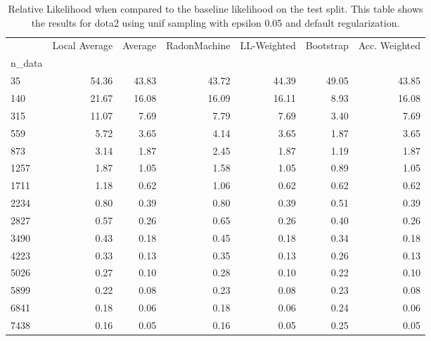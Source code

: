 \begin{table}
\centering
\caption{Relative Likelihood when compared to the baseline likelihood on the test split. This table shows the results for  dota2 using  unif sampling with epsilon  0.05 and  default regularization.}
\label{tab:5}
\begin{tabular}{lrrrrrr}
\toprule
{} &  Local Average &  Average &  RadonMachine &  LL-Weighted &  Bootstrap &  Acc. Weighted \\
n\_data &                &          &               &              &            &                \\
\midrule
35     &          54.36 &    43.83 &         43.72 &        44.39 &      49.05 &          43.85 \\
140    &          21.67 &    16.08 &         16.09 &        16.11 &       8.93 &          16.08 \\
315    &          11.07 &     7.69 &          7.79 &         7.69 &       3.40 &           7.69 \\
559    &           5.72 &     3.65 &          4.14 &         3.65 &       1.87 &           3.65 \\
873    &           3.14 &     1.87 &          2.45 &         1.87 &       1.19 &           1.87 \\
1257   &           1.87 &     1.05 &          1.58 &         1.05 &       0.89 &           1.05 \\
1711   &           1.18 &     0.62 &          1.06 &         0.62 &       0.62 &           0.62 \\
2234   &           0.80 &     0.39 &          0.80 &         0.39 &       0.51 &           0.39 \\
2827   &           0.57 &     0.26 &          0.65 &         0.26 &       0.40 &           0.26 \\
3490   &           0.43 &     0.18 &          0.45 &         0.18 &       0.34 &           0.18 \\
4223   &           0.33 &     0.13 &          0.35 &         0.13 &       0.26 &           0.13 \\
5026   &           0.27 &     0.10 &          0.28 &         0.10 &       0.22 &           0.10 \\
5899   &           0.22 &     0.08 &          0.23 &         0.08 &       0.23 &           0.08 \\
6841   &           0.18 &     0.06 &          0.18 &         0.06 &       0.24 &           0.06 \\
7438   &           0.16 &     0.05 &          0.16 &         0.05 &       0.25 &           0.05 \\
\bottomrule
\end{tabular}
\end{table}
